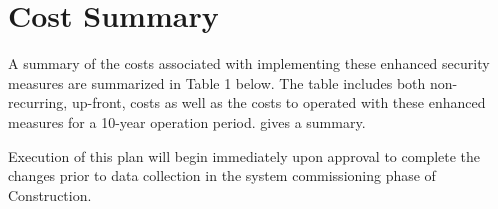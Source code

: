 \section{Cost Summary}\label{sec:cost}

A summary of the costs associated with implementing these enhanced security measures are summarized in Table 1 below. The table includes both non-recurring, up-front, costs as well as the costs to operated with these enhanced measures for a 10-year operation period.  gives a summary.



Execution of this plan will begin immediately upon approval to complete the changes prior to data collection in the system commissioning phase of Construction.

